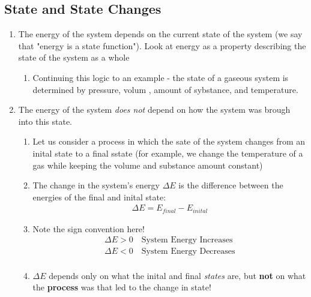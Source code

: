 \documentclass{article}  %
\begin{document}
\subsection*{State and State Changes}
\begin{enumerate}
    \item The energy of the system depends on the current state of the system (we say that "energy is a state function"). Look at energy as a property describing the state of the system as a whole
        \begin{enumerate}
            \item Continuing this logic to an example - the state of a gaseous system is determined by pressure, volum , amount of sybstance, and temperature.
        \end{enumerate}
    \item The energy of the system \emph{does not} depend on how the system was brough into this state.
        \begin{enumerate}
            \item Let us consider a process in which the sate of the system changes from an inital state to a final sstate (for example, we change the temperature of a gas while keeping the volume and substance amount constant)
            \item The change in the system's energy $\Delta E$ is the difference between the energies of the final and inital state:
                \begin{equation*}
                    \begin{aligned}
                        \Delta E = E_{final} - E_{inital}
                    \end{aligned}
                \end{equation*}
            \item Note the sign convention here!
                \begin{equation*}
                    \begin{aligned}
                        \Delta E > 0 \quad \text{System Energy Increases} \\
                        \Delta E < 0 \quad \text{System Energy Decreases} \\
                    \end{aligned}
                \end{equation*}
            \item $\Delta E$ depends only on what the inital and final \emph{states} are, but \textbf{not} on what the \textbf{process} was that led to the change in state!
        \end{enumerate}
\end{enumerate}
\end{document}
